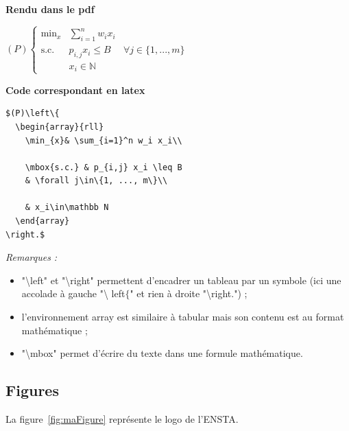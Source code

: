 \documentclass[12pt]{report}
\begin{document}
\begin{minipage}[t]{.4\linewidth}
\textbf{Rendu dans le pdf}
  \begin{center}
$(P)\left\{
  \begin{array}{rll}
    \min_{x}& \sum_{i=1}^n w_i x_i\\

    \mbox{s.c.} & p_{i,j} x_i \leq B 
    & \forall j\in\{1, ..., m\}\\

    & x_i\in\mathbb N
  \end{array}
\right.$
            \end{center}
          \end{minipage}\hfill\vrule\hfill
\begin{minipage}[t]{.5\linewidth}
  \begin{center}
\textbf{Code correspondant en latex}
\begin{verbatim}
$(P)\left\{
  \begin{array}{rll}
    \min_{x}& \sum_{i=1}^n w_i x_i\\

    \mbox{s.c.} & p_{i,j} x_i \leq B 
    & \forall j\in\{1, ..., m\}\\

    & x_i\in\mathbb N
  \end{array}
\right.$
\end{verbatim}

            \end{center}
          \end{minipage}


\textit{Remarques :}
\begin{itemize}
\item   "\textbackslash  left"   et   "\textbackslash  right"   permettent
  d'encadrer un
  tableau par  un symbole (ici  une accolade à  gauche "\textbackslash
  left$\{$" et rien à droite "\textbackslash right.") ;
\item  l'environnement array  est similaire  à tabular  mais son
  contenu est au format mathématique ;
\item "\textbackslash mbox" permet d'écrire du texte dans une formule mathématique.
\end{itemize}


\subsection{Figures}

La figure~\ref{fig:maFigure} représente le logo de l'ENSTA.
\end{document}
